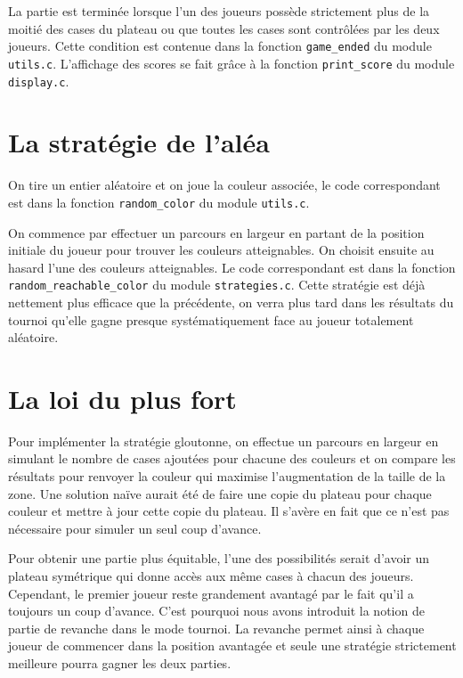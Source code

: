 \documentclass[12pt,S,fira-sans]{paper}
\begin{document}
\begin{qu}
    La partie est terminée lorsque l'un des joueurs possède strictement plus de la moitié des cases du plateau ou que toutes les cases sont contrôlées par les deux joueurs.
    Cette condition est contenue dans la fonction \verb|game_ended| du module \verb|utils.c|. L'affichage des scores se fait grâce à la fonction \verb|print_score| du module \verb|display.c|.
\end{qu}

\section{La stratégie de l'aléa}

\begin{qu}
    On tire un entier aléatoire et on joue la couleur associée, le code correspondant est dans la fonction \verb|random_color| du module \verb|utils.c|.
\end{qu}

\begin{qu}
    On commence par effectuer un parcours en largeur en partant de la position initiale du joueur pour trouver les couleurs atteignables. On choisit ensuite au hasard l'une des couleurs atteignables. Le code correspondant est dans la fonction \verb|random_reachable_color| du module \verb|strategies.c|.
    Cette stratégie est déjà nettement plus efficace que la précédente, on verra plus tard dans les résultats du tournoi qu'elle gagne presque systématiquement face au joueur totalement aléatoire.
\end{qu}

\section{La loi du plus fort}

\begin{qu}
    Pour implémenter la stratégie gloutonne, on effectue un parcours en largeur en simulant le nombre de cases ajoutées pour chacune des couleurs et on compare les résultats pour renvoyer la couleur qui maximise l'augmentation de la taille de la zone.
    Une solution naïve aurait été de faire une copie du plateau pour chaque couleur et mettre à jour cette copie du plateau. Il s'avère en fait que ce n'est pas nécessaire pour simuler un seul coup d'avance.
\end{qu}

\begin{qu}
    Pour obtenir une partie plus équitable, l'une des possibilités serait d'avoir un plateau symétrique qui donne accès aux même cases à chacun des joueurs. Cependant, le premier joueur reste grandement avantagé par le fait qu'il a toujours un coup d'avance. C'est pourquoi nous avons introduit la notion de partie de revanche dans le mode tournoi. La revanche permet ainsi à chaque joueur de commencer dans la position avantagée et seule une stratégie strictement meilleure pourra gagner les deux parties.
\end{qu}
\end{document}
